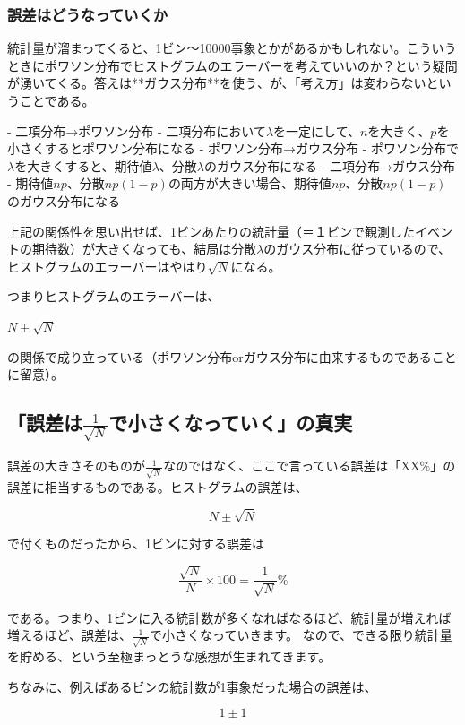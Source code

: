 \subsubsection{誤差はどうなっていくか}
統計量が溜まってくると、1ビン〜10000事象とかがあるかもしれない。こういうときにポワソン分布でヒストグラムのエラーバーを考えていいのか？という疑問が湧いてくる。答えは**ガウス分布**を使う、が、「考え方」は変わらないということである。

- 二項分布→ポワソン分布
- 二項分布において$\lambda$を一定にして、$n$を大きく、$p$を小さくするとポワソン分布になる
- ポワソン分布→ガウス分布
- ポワソン分布で$\lambda$を大きくすると、期待値$\lambda$、分散$\lambda$のガウス分布になる
- 二項分布→ガウス分布
- 期待値$np$、分散$np(1-p)$の両方が大きい場合、期待値$np$、$分散np(1-p)$のガウス分布になる

上記の関係性を思い出せば、1ビンあたりの統計量（＝１ビンで観測したイベントの期待数）が大きくなっても、結局は分散$\lambda$のガウス分布に従っているので、ヒストグラムのエラーバーはやはり$\sqrt{N}$になる。

つまりヒストグラムのエラーバーは、

$N\pm\sqrt{N}$

の関係で成り立っている（ポワソン分布orガウス分布に由来するものであることに留意）。


\subsection{「誤差は$\frac{1}{\sqrt{N}}$で小さくなっていく」の真実}
誤差の大きさそのものが$\frac{1}{\sqrt{N}}$なのではなく、ここで言っている誤差は「XX\%」の誤差に相当するものである。ヒストグラムの誤差は、

\begin{equation}
  N\pm\sqrt{N}
\end{equation}

で付くものだったから、1ビンに対する誤差は

\begin{equation}
  \frac{\sqrt{N}}{N}\times 100 = \frac{1}{\sqrt{N}} \%
\end{equation}

である。つまり、1ビンに入る統計数が多くなればなるほど、統計量が増えれば増えるほど、誤差は、$\frac{1}{\sqrt{N}}$で小さくなっていきます。
なので、できる限り統計量を貯める、という至極まっとうな感想が生まれてきます。

ちなみに、例えばあるビンの統計数が1事象だった場合の誤差は、

\begin{equation}
  1\pm 1
\end{equation}


